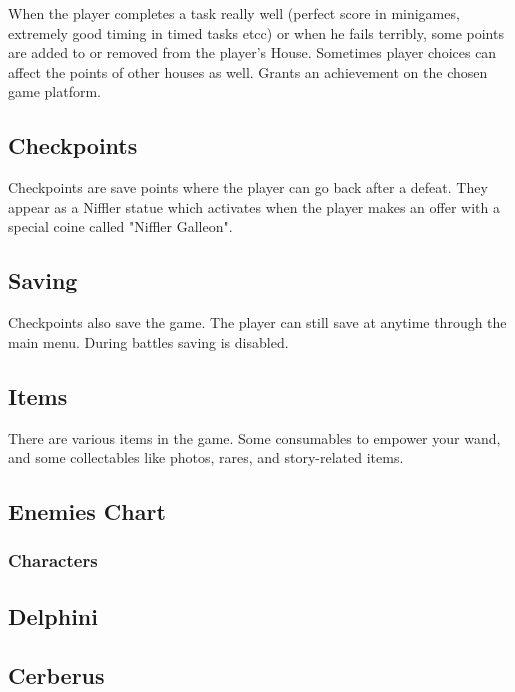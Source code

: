 When the player completes a task really well (perfect score in minigames, extremely good timing in timed tasks etcc) or when he fails terribly, some points are added to or removed from the player's House. Sometimes player choices can affect the points of other houses as well.
Grants an achievement on the chosen game platform.

\subsection{Checkpoints }

Checkpoints are save points where the player can go back after a defeat. They appear as a Niffler statue which activates when the player makes an offer with a special coine called "Niffler Galleon".

\subsection{Saving}

Checkpoints also save the game. The player can still save at anytime through the main menu. During battles saving is disabled.

\subsection{Items}

There are various items in the game. Some consumables to empower your wand, and some collectables like photos, rares, and story-related items.



\subsection{Enemies Chart}

\pagebreak

\subsubsection{Characters}

\subsection{Delphini}

\subsection{Cerberus}
